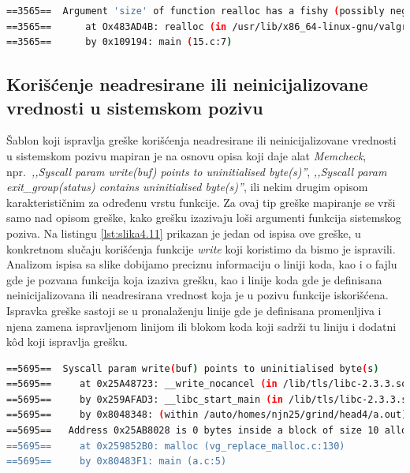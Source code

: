 \documentclass[12pt,oneside]{memoir}
\theoremstyle{plain}
\theoremstyle{definition}
\begin{document}

\begin{lstlisting}[style=terminal,caption={Ispis greške sumnjive vrednosti argumenta}, label={lst:slika4.10},language={bash}]   
==3565==  Argument 'size' of function realloc has a fishy (possibly negative) value: -12
==3565==      at Ox483AD4B: realloc (in /usr/lib/x86_64-linux-gnu/valgrind/vgpreload_memcheck-amd64-linux.so) 
==3565==      by 0x109194: main (15.c:7)
\end{lstlisting}

\subsection{Korišćenje neadresirane ili neinicijalizovane vrednosti u sistemskom pozivu}
Šablon koji ispravlja greške korišćenja neadresirane ili neinicijalizovane vrednosti u sistemskom pozivu mapiran je na osnovu opisa koji daje alat \textit{Memcheck}, npr.~\textit{,,Syscall param write(buf) points to uninitialised byte(s)''}, \textit{,,Syscall param exit\_group(status) contains uninitialised byte(s)''}, ili nekim drugim opisom karakterističnim za određenu vrstu funkcije. Za ovaj tip greške mapiranje se vrši samo nad opisom greške, kako grešku izazivaju loši argumenti funkcija sistemskog poziva. Na listingu \ref{lst:slika4.11} prikazan je jedan od ispisa ove greške, u konkretnom slučaju korišćenja funkcije \textit{write} koji koristimo da bismo je ispravili. Analizom ispisa sa slike dobijamo preciznu informaciju o liniji koda, kao i o fajlu gde je pozvana funkcija koja izaziva grešku, kao i linije koda gde je definisana neinicijalizovana ili neadresirana vrednost koja je u pozivu funkcije iskorišćena. Ispravka greške sastoji se u pronalaženju linije gde je definisana promenljiva i njena zamena ispravljenom linijom ili blokom koda koji sadrži tu liniju i dodatni k\^od koji ispravlja grešku.  

\begin{lstlisting}[style=terminal,caption={Primer ispisa greške korišćenja neinicializovane ili neadresirane vrednosti u sistemskom pozivu}, label={lst:slika4.11},language={bash}] 
==5695==  Syscall param write(buf) points to uninitialised byte(s)
==5695==     at 0x25A48723: __write_nocancel (in /lib/tls/libc-2.3.3.so)
==5695==     by 0x259AFAD3: __libc_start_main (in /lib/tls/libc-2.3.3.so)
==5695==     by 0x8048348: (within /auto/homes/njn25/grind/head4/a.out)
==5695==   Address 0x25AB8028 is 0 bytes inside a block of size 10 alloc'd
==5695==     at 0x259852B0: malloc (vg_replace_malloc.c:130)
==5695==     by 0x80483F1: main (a.c:5)
\end{lstlisting}
\end{document}
